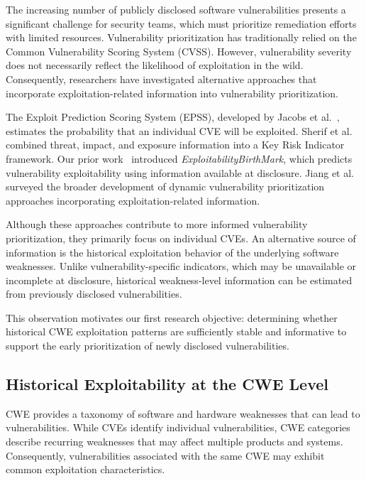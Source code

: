 \documentclass[conference,compsoc]{IEEEtran}
\begin{document}
The increasing number of publicly disclosed software
vulnerabilities presents a significant challenge for
security teams, which must prioritize remediation
efforts with limited resources. Vulnerability
prioritization has traditionally relied on the
Common Vulnerability Scoring System (CVSS).
However, vulnerability severity does not necessarily
reflect the likelihood of exploitation in the wild.
Consequently, researchers have investigated
alternative approaches that incorporate
exploitation-related information into vulnerability
prioritization.

The Exploit Prediction Scoring System (EPSS),
developed by Jacobs et al.~\cite{jacobs2021epss},
estimates the probability that an individual CVE
will be exploited. Sherif et al.~\cite{sherif2026kri}
combined threat, impact, and exposure information
into a Key Risk Indicator framework.
Our prior
work~\cite{khanmohammadi2025exploitabilitybirthmark}
introduced \textit{ExploitabilityBirthMark},
which predicts vulnerability exploitability using
information available at disclosure.
Jiang et al.~\cite{jiang2025survey} surveyed
the broader development of dynamic vulnerability
prioritization approaches incorporating
exploitation-related information.

Although these approaches contribute to more
informed vulnerability prioritization, they
primarily focus on individual CVEs. An alternative
source of information is the historical exploitation
behavior of the underlying software weaknesses.
Unlike vulnerability-specific indicators, which
may be unavailable or incomplete at disclosure,
historical weakness-level information can be
estimated from previously disclosed vulnerabilities.

This observation motivates our first research
objective: determining whether historical CWE
exploitation patterns are sufficiently stable
and informative to support the early prioritization
of newly disclosed vulnerabilities.

\subsection{Historical Exploitability at the CWE Level}

CWE provides
a taxonomy of software and hardware weaknesses
that can lead to vulnerabilities. While CVEs
identify individual vulnerabilities, CWE categories
describe recurring weaknesses that may affect
multiple products and systems. Consequently,
vulnerabilities associated with the same CWE
may exhibit common exploitation characteristics.
\end{document}
